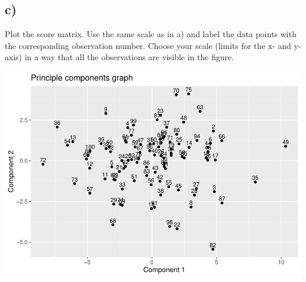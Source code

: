 \documentclass[
]{article}
\newenvironment{Shaded}{\begin{snugshade}}{\end{snugshade}}
\newcommand{\AttributeTok}[1]{\textcolor[rgb]{0.77,0.63,0.00}{#1}}
\newcommand{\DecValTok}[1]{\textcolor[rgb]{0.00,0.00,0.81}{#1}}
\newcommand{\FloatTok}[1]{\textcolor[rgb]{0.00,0.00,0.81}{#1}}
\newcommand{\FunctionTok}[1]{\textcolor[rgb]{0.00,0.00,0.00}{#1}}
\newcommand{\NormalTok}[1]{#1}
\newcommand{\SpecialCharTok}[1]{\textcolor[rgb]{0.00,0.00,0.00}{#1}}
\newcommand{\StringTok}[1]{\textcolor[rgb]{0.31,0.60,0.02}{#1}}
\begin{document}
\hypertarget{c}{%
\subsection{c)}\label{c}}

Plot the score matrix. Use the same scale as in a) and label the data
points with the corresponding observation number. Choose your scale
(limits for the x- and y-axis) in a way that all the observations are
visible in the figure.\\

\begin{Shaded}
\end{Shaded}

\includegraphics{assignment2_files/figure-latex/unnamed-chunk-4-1.pdf}
\end{document}
